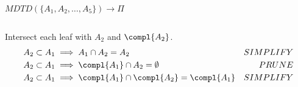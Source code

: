\begin{frame}[t]{$MDTD( \{A_1, A_2, \ldots, A_5\})\to\Pi$}
  \begin{columns}
    \begin{column}{0.6\textwidth}
      \scalebox{1.5}{\usebox\boxforestD}%
    \end{column}
    \begin{column}{0.4\textwidth}
      {\scalebox{0.7}{}}%
    \end{column}
  \end{columns}%
  
  Intersect each leaf with $A_2$ and $\compl{A_2}$.
  \begin{align*}
    A_2 \subset A_1 &\implies A_1\cap A_2 = A_2 & SIMPLIFY\\
    A_2 \subset A_1 &\implies \compl{A_1}\cap A_2 = \emptyset & PRUNE\\
    A_2 \subset A_1 &\implies \compl{A_1}\cap \compl{A_2} = \compl{A_1} & SIMPLIFY
  \end{align*}
\end{frame}

  
  
  
  

  
  

